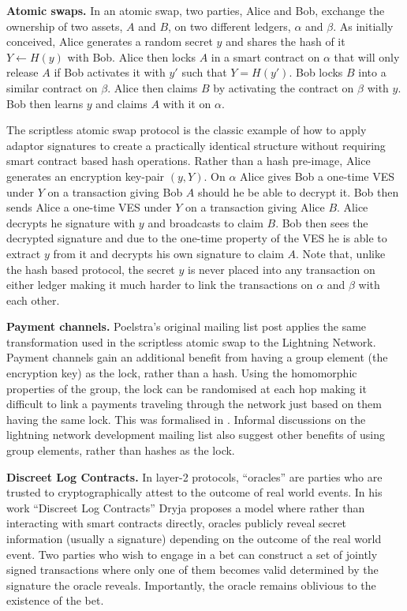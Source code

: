 \hfill \break \textbf{Atomic swaps.}  In an atomic swap, two parties, Alice and Bob, exchange the ownership of two assets, $A$ and $B$, on two different ledgers, $\alpha$ and $\beta$. As initially conceived\cite{atomic-swap}, Alice generates a random secret $y$ and shares the hash of it $Y \gets H(y)$ with Bob. Alice then locks $A$ in a smart contract on $\alpha$ that will only release $A$ if Bob activates it with $y'$ such that $Y = H(y')$. Bob locks $B$ into a similar contract on $\beta$. Alice then claims $B$ by activating the contract on $\beta$ with $y$. Bob then learns $y$ and claims $A$ with it on $\alpha$.

The scriptless atomic swap protocol\cite{scriptless-atomic-swap} is the classic example of how to apply adaptor signatures to create a practically identical structure without requiring smart contract based hash operations. Rather than a hash pre-image, Alice generates an encryption key-pair $(y,Y)$. On $\alpha$ Alice gives Bob a one-time VES under $Y$ on a transaction giving Bob $A$ should he be able to decrypt it. Bob then sends Alice a one-time VES under $Y$ on a transaction giving Alice $B$. Alice decrypts he signature with $y$ and broadcasts to claim $B$. Bob then sees the decrypted signature and due to the one-time property of the VES he is able to extract $y$ from it and decrypts his own signature to claim $A$. Note that, unlike the hash based protocol, the secret $y$ is never placed into any transaction on either ledger making it much harder to link the transactions on $\alpha$ and $\beta$ with each other.

\hfill \break \textbf{Payment channels.} Poelstra's original mailing list post applies the same transformation used in the scriptless atomic swap to the Lightning Network\cite{poon2016bitcoin}. Payment channels gain an additional benefit from having a group element (the encryption key) as the lock, rather than a hash. Using the homomorphic properties of the group, the lock can be randomised at each hop making it difficult to link a payments traveling through the network just based on them having the same lock. This was formalised in \cite{cryptoeprint:2018:472}. %
Informal discussions on the lightning network development mailing list also suggest other benefits of using group elements, rather than hashes as the lock\cite{lightning-dev-scriptless-scripts}.

\hfill \break \textbf{Discreet Log Contracts.} In layer-2 protocols, ``oracles'' are parties who are trusted to cryptographically attest to the outcome of real world events. In his work ``Discreet Log Contracts''\cite{dryja2017discreet} Dryja proposes a model where rather than interacting with smart contracts directly, oracles publicly reveal secret information (usually a signature) depending on the outcome of the real world event. Two parties who wish to engage in a bet can construct a set of jointly signed transactions where only one of them becomes valid determined by the signature the oracle reveals. Importantly, the oracle remains oblivious to the existence of the bet.

